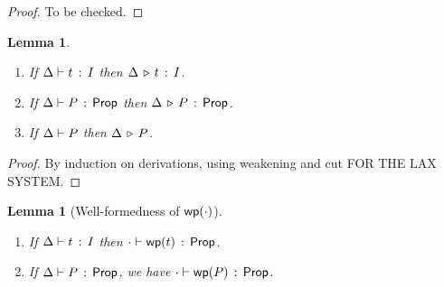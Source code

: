 \documentclass[10pt,letter]{article}
\newtheorem{lemma}[theorem]{Lemma}
\begin{document}
\begin{proof}
  To be checked.
\end{proof}

\begin{lemma}
\mbox{}
\begin{enumerate}
  \item If $\Delta \vdash t\, :\, I$ then 
    $\Delta \,\triangleright\, t\, :\, I$.
  \item If $\Delta \vdash P\, :\, \mathsf{Prop}$ then
    $\Delta \,\triangleright\, P\,:\, \mathsf{Prop}$.
  \item If $\Delta \vdash P$ then
    $\Delta \,\triangleright\, P$.
\end{enumerate}
\end{lemma}

\begin{proof}
By induction on derivations, using weakening and cut FOR THE LAX SYSTEM.
\end{proof}


\begin{lemma}[Well-formedness of  $\mathop{\mathsf{wp}}(\cdot)$]
\label{lemma:wfwp}
\mbox{}
  \begin{enumerate}
  \item If $\Delta \vdash t\, :\, I$ then
    $\cdot \vdash \mathop{\mathsf{wp}}(t)\, :\, \mathsf{Prop}$.
  \item If $\Delta \vdash P\, :\, \mathsf{Prop}$, we have
    $\cdot \vdash \mathop{\mathsf{wp}}(P)\, :\, \mathsf{Prop}$.
  \end{enumerate}
\end{lemma}
\end{document}
